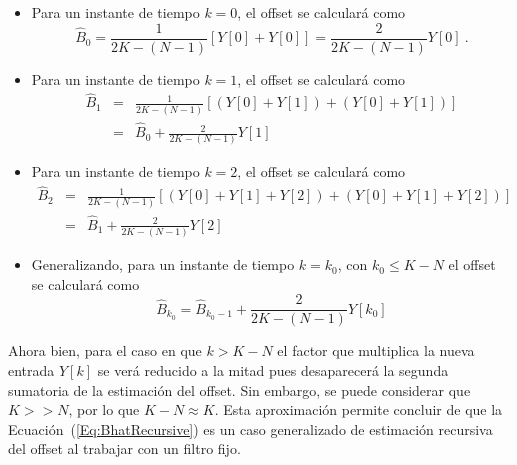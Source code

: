 \begin{itemize}
\item Para un instante de tiempo $k=0$, el offset se calculará como
$$\hat{B}_0 = \frac{1}{2K-(N-1)}\left[Y[0] + Y[0]\right] = \frac{2}{2K-(N-1)}Y[0]~.$$

\item Para un instante de tiempo $k=1$, el offset se calculará como
\begin{eqnarray*}
 \hat{B}_1 &=& \frac{1}{2K-(N-1)}\left[\left(Y[0] + Y[1]\right)  + \left(Y[0] + Y[1]\right)\right]\\
	&=& \hat{B}_0 + \frac{2}{2K-(N-1)}Y[1]
\end{eqnarray*}

\item Para un instante de tiempo $k=2$, el offset se calculará como
\begin{eqnarray*}
 \hat{B}_2 &=& \frac{1}{2K-(N-1)}\left[\left(Y[0] + Y[1] + Y[2]\right)  + \left(Y[0] + Y[1] + Y[2]\right)\right]\\
	&=& \hat{B}_1 + \frac{2}{2K-(N-1)}Y[2]
\end{eqnarray*}

\item Generalizando, para un instante de tiempo $k=k_0$, con $k_0\leq K-N$ el offset se calculará como
\begin{equation}
 \hat{B}_{k_0} =  \hat{B}_{k_0-1} + \frac{2}{2K-(N-1)}Y[k_0]
\label{Eq:BhatRecursive}
\end{equation}
\end{itemize}
Ahora bien, para el caso en que $k > K-N$ el factor que multiplica la nueva entrada $Y[k]$ se verá reducido a la mitad pues desaparecerá la segunda sumatoria de la estimación del offset. Sin embargo, se puede considerar que $K>>N$, por lo que $K-N\approx K$. Esta aproximación permite concluir de que la Ecuación~(\ref{Eq:BhatRecursive}) es un caso generalizado de estimación recursiva del offset al trabajar con un filtro fijo.

